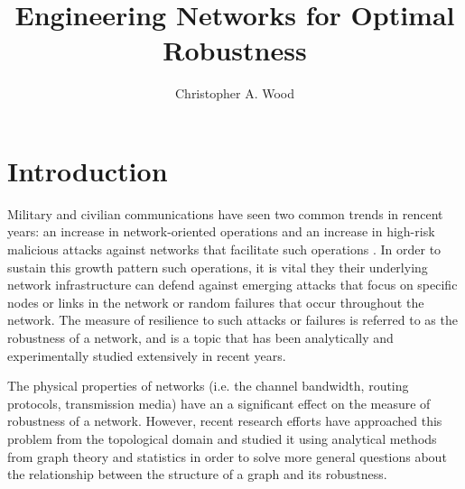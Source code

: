 \documentclass[doc]{apa}%
\title{Engineering Networks for Optimal Robustness}
\author{Christopher A. Wood}
\affiliation{Department of Computer Science \\ Rochester Institute of Technology}
\begin{document}
\maketitle   

\section{Introduction}

Military and civilian communications have seen two common trends in rencent years: an increase in network-oriented operations and an increase in high-risk malicious attacks against networks that facilitate such operations \cite{Bernardnetworkrobustness}. In order to sustain this growth pattern such operations, it is vital they their underlying network infrastructure can defend against emerging attacks that focus on specific nodes or links in the network or random failures that occur throughout the network. The measure of resilience to such attacks or failures is referred to as the robustness of a network, and is a topic that has been analytically and experimentally studied extensively in recent years.

The physical properties of networks (i.e. the channel bandwidth, routing protocols, transmission media) have an a significant effect on the measure of robustness of a network. However, recent research efforts have approached this problem from the topological domain and studied it using analytical methods from graph theory and statistics in order to solve more general questions about the relationship between the structure of a graph and its robustness. 
\end{document}
